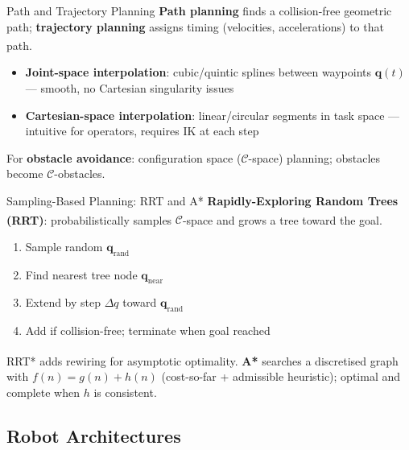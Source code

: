 \begin{v3topic}{Path and Trajectory Planning}
    \textbf{Path planning} finds a collision-free geometric path; \textbf{trajectory planning} assigns timing (velocities, accelerations) to that path\textsuperscript{\cite[][pp.~170--200]{sicilianoRobotics2009}}.
    \begin{itemize}
        \item \textbf{Joint-space interpolation}: cubic/quintic splines between waypoints $\mathbf{q}(t)$ — smooth, no Cartesian singularity issues
        \item \textbf{Cartesian-space interpolation}: linear/circular segments in task space — intuitive for operators, requires IK at each step
    \end{itemize}
    For \textbf{obstacle avoidance}: configuration space ($\mathcal{C}$-space) planning; obstacles become $\mathcal{C}$-obstacles.

\end{v3topic}
\begin{v3topic}{Sampling-Based Planning: RRT and A*}
    \textbf{Rapidly-Exploring Random Trees (RRT)}\textsuperscript{\cite[][pp.~293--300]{karrasRRTPathPlanning2020}}: probabilistically samples $\mathcal{C}$-space and grows a tree toward the goal.
    \begin{enumerate}
        \item Sample random $\mathbf{q}_{\text{rand}}$
        \item Find nearest tree node $\mathbf{q}_{\text{near}}$
        \item Extend by step $\Delta q$ toward $\mathbf{q}_{\text{rand}}$
        \item Add if collision-free; terminate when goal reached
    \end{enumerate}
    RRT* adds rewiring for asymptotic optimality.
    \textbf{A*}\textsuperscript{\cite[][pp.~100--107]{astarPathPlanning1968}} searches a discretised graph with $f(n) = g(n) + h(n)$ (cost-so-far + admissible heuristic); optimal and complete when $h$ is consistent.
\end{v3topic}

\subsection{Robot Architectures}

